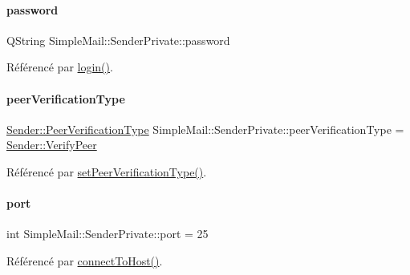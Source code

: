 \paragraph{\texorpdfstring{password}{password}}
{\footnotesize\ttfamily Q\+String Simple\+Mail\+::\+Sender\+Private\+::password}



Référencé par \hyperlink{class_simple_mail_1_1_sender_private_a927e5c262ee89fb335410ebec020091d}{login()}.

\mbox{\label{class_simple_mail_1_1_sender_private_ab6854bd0a124acdc3e21aef40e59c41a}} 
\paragraph{\texorpdfstring{peer\+Verification\+Type}{peerVerificationType}}
{\footnotesize\ttfamily \hyperlink{class_simple_mail_1_1_sender_acfbcf388ab7c26cd41c5c77601fe8804}{Sender\+::\+Peer\+Verification\+Type} Simple\+Mail\+::\+Sender\+Private\+::peer\+Verification\+Type = \hyperlink{class_simple_mail_1_1_sender_acfbcf388ab7c26cd41c5c77601fe8804ac24a70d89382bb95b91501222056c389}{Sender\+::\+Verify\+Peer}}



Référencé par \hyperlink{class_simple_mail_1_1_sender_private_aea040b22ce411e03111080e7546f91c0}{set\+Peer\+Verification\+Type()}.

\mbox{\label{class_simple_mail_1_1_sender_private_a6de1c85bd163d9916a4f24ef91926d4c}} 
\paragraph{\texorpdfstring{port}{port}}
{\footnotesize\ttfamily int Simple\+Mail\+::\+Sender\+Private\+::port = 25}



Référencé par \hyperlink{class_simple_mail_1_1_sender_private_aa2f9a37cfe58c3e39afa75e79070cee1}{connect\+To\+Host()}.

